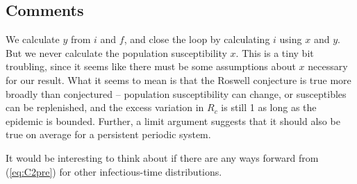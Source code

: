 \documentclass[12pt]{article}
\newcommand{\eqref}[1]{(\ref{eq:#1})}
\begin{document}
\subsection*{Comments}

We calculate $y$ from $i$ and $f$, and close the loop by calculating $i$ using $x$ and $y$. But we never calculate the population susceptibility $x$. This is a tiny bit troubling, since it seems like there must be some assumptions about $x$ necessary for our result. What it seems to mean is that the Roswell conjecture is true more broadly than conjectured – population susceptibility can change, or susceptibles can be replenished, and the excess variation in $R_c$ is still 1 as long as the epidemic is bounded. Further, a limit argument suggests that it should also be true on average for a persistent periodic system.

It would be interesting to think about if there are any ways forward from \eqref{C2pre} for other infectious-time distributions.
\end{document}
